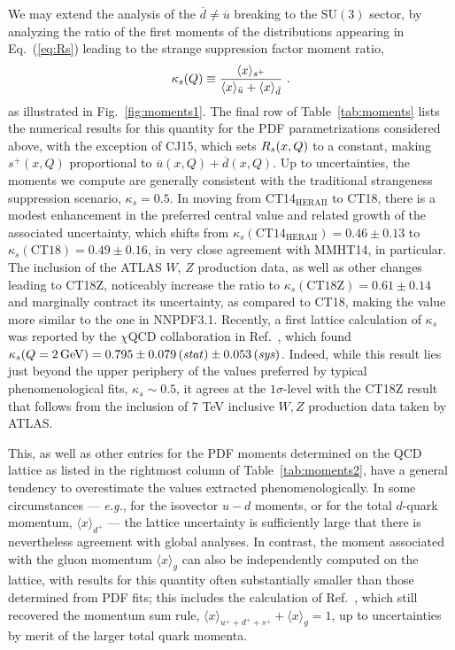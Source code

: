 We may extend the analysis of the $\overline{d} \neq \overline{u}$ breaking to the $\mathrm{SU}(3)$ sector, by
analyzing the ratio of the first moments of the distributions appearing in Eq.~(\ref{eq:Rs}) leading to the
strange suppression factor moment ratio,
%
\begin{equation}
	\kappa_s(Q) \equiv \frac{\langle x \rangle_{s^+}}{\langle x \rangle_{\bar{u}} + \langle x \rangle_{\bar{d}}}\ .
\label{eq:str-supp}
\end{equation}
%
as illustrated in Fig.~\ref{fig:moments1}. The final row of Table~\ref{tab:moments} lists the numerical results for this quantity 
for the PDF parametrizations considered above, with the exception of
CJ15, which sets $R_s(x,Q)$ to a constant, making $s^+(x,Q)$
proportional to $\overline{u}(x,Q) + \overline{d}(x,Q)$.
%
%
Up to uncertainties, the moments we compute are generally consistent with the traditional strangeness suppression scenario,
$\kappa_s\! =\! 0.5$. In moving from CT14$_\mathrm{HERAII}$ to CT18, there is a modest enhancement in the preferred central
value and related growth of the associated uncertainty, which shifts from $\kappa_s({\mathrm{CT14}_\mathrm{HERAII}})\! =\! 0.46\! \pm\! 0.13$
  to $\kappa_s(\mathrm{CT18})\! =\! 0.49\! \pm\! 0.16$, in very close agreement with MMHT14, in particular. The inclusion of the ATLAS $W,\, Z$ production data, as well as other changes leading to CT18Z, noticeably increase the ratio
  to $\kappa_s(\mathrm{CT18Z})\! =\! 0.61\! \pm\! 0.14$ and marginally contract its uncertainty, as compared to CT18, making the value more similar to the one in NNPDF3.1.
%
Recently, a first lattice calculation of $\kappa_s$ was reported by the $\chi$QCD collaboration in
Ref.~\cite{Liang:2019xdx}, which found $\kappa_s(Q = 2\,\mathrm{GeV}) = 0.795 \pm 0.079\, (\mathit{stat}) \pm 0.053\, (\mathit{sys})$.
Indeed, while this result lies just beyond the upper periphery of the values preferred by typical phenomenological fits,
$\kappa_s \sim 0.5$, it agrees at the $1\sigma$-level with the CT18Z result that follows from the inclusion of 7 TeV inclusive $W,Z$
production data taken by ATLAS.
%

%
This, as well as other entries for the PDF moments determined
on the QCD lattice as listed in the rightmost column of Table~\ref{tab:moments2}, have a general tendency to overestimate the values extracted phenomenologically. In some circumstances ---
{\it e.g.}, for the isovector $u\!-\!d$ moments, or for the total $d$-quark momentum, $\langle x \rangle_{d^+}$ --- the lattice uncertainty
is sufficiently large that there is nevertheless agreement with global analyses. In contrast, the moment associated with the
gluon momentum $\langle x \rangle_{g}$ can also be independently computed on the lattice, with results for this quantity often
substantially smaller than those determined from PDF fits; this includes the calculation of Ref.~\cite{Alexandrou:2017oeh},
which still recovered the momentum sum rule, $\langle x \rangle_{u^++d^++s^+}+\langle x \rangle_{g}\! =\! 1$, up to uncertainties
by merit of the larger total quark momenta.
%


